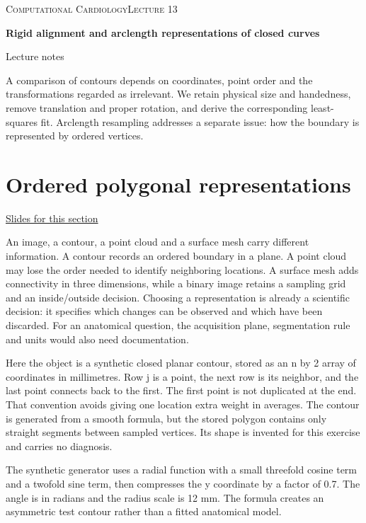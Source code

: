 \documentclass[11pt,letterpaper]{article}
\theoremstyle{definition}\newtheorem{definition}{Definition}\newtheorem{example}{Example}
\numberwithin{equation}{section}
\begin{document}
{\small\scshape Computational Cardiology\hfill Lecture 13}\par\medskip
{\raggedright{}\LARGE\bfseries\color{ink} Rigid alignment and arclength representations of closed curves\par}\medskip
{\small Lecture notes}\par\bigskip
A comparison of contours depends on coordinates, point order and the transformations regarded as irrelevant. We retain physical size and handedness, remove translation and proper rotation, and derive the corresponding least-squares fit. Arclength resampling addresses a separate issue: how the boundary is represented by ordered vertices.

\section{Ordered polygonal representations}
\hypertarget{note-ordered-polygonal-representations}{}\label{note:ordered-polygonal-representations}
{\small \href{slides.html\#frame=a-cyclic-polygon-in-physical-coordinates\&step=1}{Slides for this section}}\par
An image, a contour, a point cloud and a surface mesh carry different information. A contour records an ordered boundary in a plane. A point cloud may lose the order needed to identify neighboring locations. A surface mesh adds connectivity in three dimensions, while a binary image retains a sampling grid and an inside/outside decision. Choosing a representation is already a scientific decision: it specifies which changes can be observed and which have been discarded. For an anatomical question, the acquisition plane, segmentation rule and units would also need documentation.

Here the object is a synthetic closed planar contour, stored as an n by 2 array of coordinates in millimetres. Row j is a point, the next row is its neighbor, and the last point connects back to the first. The first point is not duplicated at the end. That convention avoids giving one location extra weight in averages. The contour is generated from a smooth formula, but the stored polygon contains only straight segments between sampled vertices. Its shape is invented for this exercise and carries no diagnosis.

The synthetic generator uses a radial function with a small threefold cosine term and a twofold sine term, then compresses the y coordinate by a factor of 0.7. The angle is in radians and the radius scale is 12 mm. The formula creates an asymmetric test contour rather than a fitted anatomical model.
\end{document}
